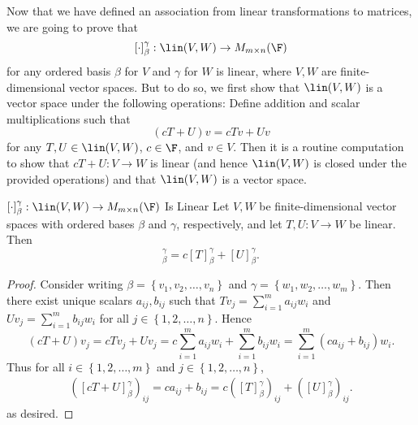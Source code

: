 \documentclass[linearalgebra]{subfiles}
\begin{document}
    \begin{remark}
        Now that we have defined an association from linear transformations to matrices, we are going to prove that 
        \begin{equation*}
            \left[ \cdot \right] _\beta^\gamma:\lin(V,W)\to M_{m\times n}(\F) 
        \end{equation*}
        for any ordered basis $\beta$ for $V$ and $\gamma$ for $W$ is linear, where $V,W$ are finite-dimensional vector spaces. But to do so, we first show that $\lin(V,W)$ is a vector space under the following operations: Define addition and scalar multiplications such that
        \begin{equation*}
            \left( cT+U \right) v = cTv+Uv
        \end{equation*}
        for any $T, U\in \lin(V, W)$, $c\in\F$, and $v\in V$. Then it is a routine computation to show that $cT+U:V\to W$ is linear (and hence $\lin(V,W)$ is closed under the provided operations) and that $\lin(V,W)$ is a vector space.
    \end{remark}

    \begin{prop}{$\left[ \cdot \right] _\beta^\gamma:\lin(V,W)\to M_{m\times n}(\F)$ Is Linear}
        Let $V, W$ be finite-dimensional vector spaces with ordered bases $\beta$ and $\gamma$, respectively, and let $T,U: V\to W$ be linear. Then
        \begin{equation*}
            [cT+U]^\gamma_\beta = c[T]^\gamma_\beta + [U]^\gamma_\beta.
        \end{equation*}
    \end{prop}

    \begin{proof}
        Consider writing $\beta = \left\lbrace v_1, v_2, \ldots, v_n \right\rbrace$ and $\gamma = \left\lbrace w_1, w_2, \ldots, w_m \right\rbrace$. Then there exist unique scalars $a_{ij}, b_{ij}$ such that $Tv_j = \sum^m_{i=1} a_{ij}w_i$ and $Uv_j = \sum^m_{i=1} b_{ij}w_i$ for all $j\in \left\lbrace 1, 2, \ldots, n \right\rbrace$. Hence
        \begin{equation*}
            (cT+U)v_j = cTv_j + Uv_j = c\sum^m_{i=1} a_{ij}w_i + \sum^m_{i=1} b_{ij}w_i = \sum^m_{i=1} (ca_{ij}+b_{ij})w_i.
        \end{equation*}
        Thus for all $i\in \left\lbrace 1, 2, \ldots, m \right\rbrace$ and $j\in \left\lbrace 1, 2, \ldots, n \right\rbrace$,
        \begin{equation*} \begin{split}
            \left( \left[ cT+U \right]^\gamma_\beta \right)_{ij} = ca_{ij}+b_{ij} = c\left( \left[ T \right]^\gamma_\beta \right)_{ij} + \left( \left[ U \right]^\gamma_\beta \right)_{ij}.
        \end{split} \end{equation*}
        as desired.
    \end{proof}
\end{document}
